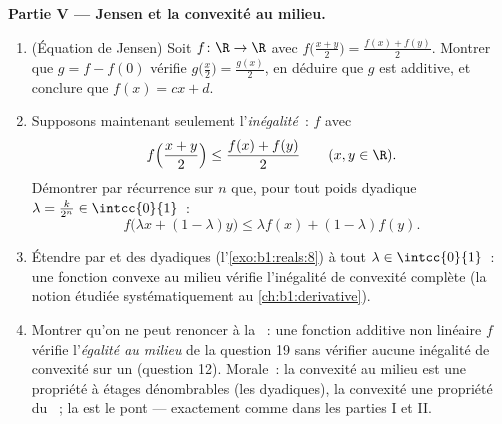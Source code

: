 \begin{problem}[{Devoir maison --- $f(x + y) = f(x) + f(y)$~:
la régularité force la linéarité, et le portrait des monstres}]
\medskip
\noindent\textbf{Partie V --- Jensen et la convexité au milieu.}
\begin{enumerate}[resume]
  \item (Équation de Jensen) Soit $f \colon \R \to \R$ 
        avec $f\bigl(\frac{x+y}{2}\bigr) = \frac{f(x)
        + f(y)}{2}$. Montrer que $g = f - f(0)$ vérifie
        $g\bigl(\frac x2\bigr) = \frac{g(x)}{2}$, en déduire que
        $g$ est additive, et conclure que $f(x) = cx + d$.
  \item Supposons maintenant seulement l'\emph{inégalité}~: $f$
         avec
        \[
        f\Bigl(\frac{x + y}{2}\Bigr) \leq \frac{f(x) +
        f(y)}{2} \qquad (x, y \in \R).
        \]
        Démontrer par récurrence sur $n$ que, pour tout poids
        dyadique $\lambda = \frac{k}{2^n} \in \intcc{0}{1}$~:
        \[
        f\bigl(\lambda x + (1 - \lambda)y\bigr) \leq \lambda
        f(x) + (1 - \lambda) f(y) .
        \]
  \item Étendre par  et  des dyadiques
        (l'\cref{exo:b1:reals:8}) à tout $\lambda \in
        \intcc{0}{1}$~: une fonction  convexe au milieu
        vérifie l'inégalité de convexité complète (la notion
        étudiée systématiquement au \cref{ch:b1:derivative}).
  \item Montrer qu'on ne peut renoncer à la ~: une
        fonction additive non linéaire $f$ vérifie
        l'\emph{égalité au milieu} de la question 19 sans vérifier
        aucune inégalité de convexité sur un  (question
        12). Morale~: la convexité au milieu est une propriété à
        étages dénombrables (les dyadiques), la convexité une
        propriété du ~; la  est le pont ---
        exactement comme dans les parties I et II.
\end{enumerate}


\end{problem}
